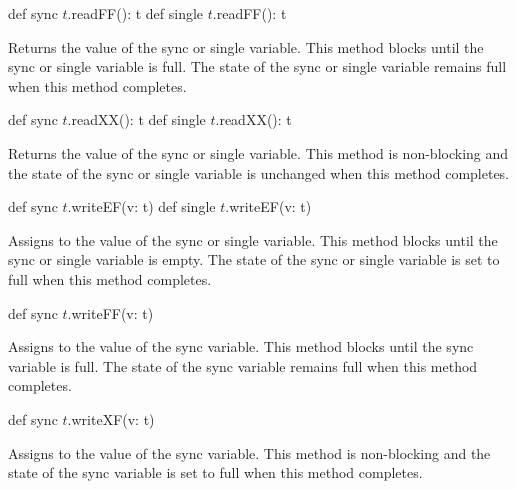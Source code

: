 \begin{protohead}
def sync $t$.readFF(): t
def single $t$.readFF(): t
\end{protohead}
\begin{protobody}
Returns the value of the sync or single variable.  This method blocks
until the sync or single variable is full.  The state of the sync or
single variable remains full when this method completes.
\end{protobody}

\begin{protohead}
def sync $t$.readXX(): t
def single $t$.readXX(): t
\end{protohead}
\begin{protobody}
Returns the value of the sync or single variable.  This method is non-blocking
and the state of the sync or single variable is unchanged when this method
completes.
\end{protobody}

\begin{protohead}
def sync $t$.writeEF(v: t)
def single $t$.writeEF(v: t)
\end{protohead}
\begin{protobody}
Assigns  to the value of the sync or single variable.  This
method blocks until the sync or single variable is empty.  The state
of the sync or single variable is set to full when this method
completes.
\end{protobody}

\begin{protohead}
def sync $t$.writeFF(v: t)
\end{protohead}
\begin{protobody}
Assigns  to the value of the sync variable.  This method
blocks until the sync variable is full.  The state of the sync
variable remains full when this method completes.
\end{protobody}

\begin{protohead}
def sync $t$.writeXF(v: t)
\end{protohead}
\begin{protobody}
Assigns  to the value of the sync variable.  This method is
non-blocking and the state of the sync variable is set to full when
this method completes.
\end{protobody}

